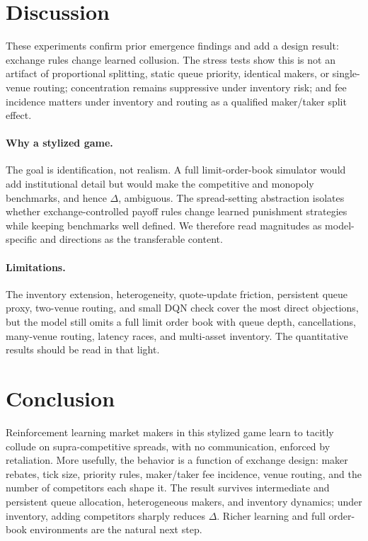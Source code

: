 \documentclass[sigconf]{acmart}
\begin{document}
\section{Discussion}

These experiments confirm prior emergence findings \cite{cont2024,macri2024} and add a design result: exchange rules change learned collusion. The stress tests show this is not an artifact of proportional splitting, static queue priority, identical makers, or single-venue routing; concentration remains suppressive under inventory risk; and fee incidence matters under inventory and routing as a qualified maker/taker split effect.

\paragraph{Why a stylized game.} The goal is identification, not realism. A full limit-order-book simulator would add institutional detail but would make the competitive and monopoly benchmarks, and hence $\Delta$, ambiguous. The spread-setting abstraction isolates whether exchange-controlled payoff rules change learned punishment strategies while keeping benchmarks well defined. We therefore read magnitudes as model-specific and directions as the transferable content.

\paragraph{Limitations.} The inventory extension, heterogeneity, quote-update friction, persistent queue proxy, two-venue routing, and small DQN check cover the most direct objections, but the model still omits a full limit order book with queue depth, cancellations, many-venue routing, latency races, and multi-asset inventory. The quantitative results should be read in that light.

\section{Conclusion}

Reinforcement learning market makers in this stylized game learn to tacitly collude on supra-competitive spreads, with no communication, enforced by retaliation. More usefully, the behavior is a function of exchange design: maker rebates, tick size, priority rules, maker/taker fee incidence, venue routing, and the number of competitors each shape it. The result survives intermediate and persistent queue allocation, heterogeneous makers, and inventory dynamics; under inventory, adding competitors sharply reduces $\Delta$. Richer learning and full order-book environments are the natural next step.



\end{document}
